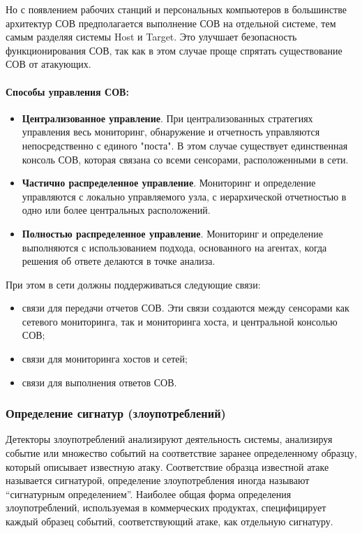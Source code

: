 Но с появлением рабочих станций и персональных компьютеров в большинстве архитектур
СОВ предполагается выполнение СОВ на отдельной системе, тем самым разделяя системы
Host и Target. Это улучшает безопасность функционирования СОВ, так как в этом случае
проще спрятать существование СОВ от атакующих.

\paragraph*{Способы управления СОВ:}

\begin{itemize}
	\item \textbf{Централизованное управление}. При централизованных стратегиях управления
	весь мониторинг, обнаружение и отчетность управляются непосредственно с единого "поста".
	В этом случае существует единственная консоль СОВ, которая связана со всеми сенсорами,
	расположенными в сети.

	\item \textbf{Частично распределенное управление}. Мониторинг и определение управляются
	с локально управляемого узла, с иерархической отчетностью в одно или более центральных
	расположений.

	\item \textbf{Полностью распределенное управление}. Мониторинг и определение выполняются
	с использованием подхода, основанного на агентах, когда решения об ответе делаются в
	точке анализа.
\end{itemize}

При этом в сети должны поддерживаться следующие связи:

\begin{itemize}
	\item связи для передачи отчетов СОВ. Эти связи создаются между сенсорами как сетевого
	мониторинга, так и мониторинга хоста, и центральной консолью СОВ;

	\item связи для мониторинга хостов и сетей;

	\item связи для выполнения ответов СОВ.
\end{itemize}

\subsubsection{Определение сигнатур (злоупотреблений)}

Детекторы злоупотреблений анализируют деятельность системы, анализируя событие или множество событий на соответствие заранее определенному образцу, который описывает известную атаку. Соответствие образца известной атаке называется сигнатурой, определение злоупотребления иногда называют ``сигнатурным определением''. Наиболее общая форма определения злоупотреблений, используемая в коммерческих продуктах, специфицирует каждый образец событий, соответствующий атаке, как отдельную сигнатуру. \autocite{IntrusionDetectionSystemsMsu}

